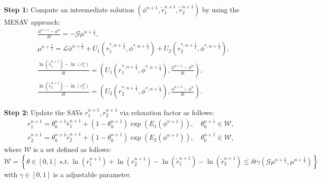 \documentclass[final,review,onefignum,onetabnum]{siamart190516}
\theoremstyle{plain}
\begin{document}
\textbf{Step 1:} Compute an intermediate solution $(\phi^{n+1}, \tilde{r}_{1}^{n+1}, \tilde{r}_{2}^{n+1})$ by using  the MESAV approach:
\begin{eqnarray}
\label{eq:R-MESAV1-CN-1}
& & \frac{\phi^{n+1}-\phi^{n}}{\delta t} =-\mathcal{G} \mu^{n+\frac{1}{2}}, \\
\label{eq:R-MESAV1-CN-2}
& & \mu^{n+\frac{1}{2}} =\mathcal{L} \phi^{n+\frac{1}{2}}+U_{1}\left(r_{1}^{*, n+\frac{1}{2}}, \phi^{*, n+\frac{1}{2}}\right)+U_{2}\left(r_{2}^{*, n+\frac{1}{2}}, \phi^{*, n+\frac{1}{2}}\right), \\ 
\label{eq:R-MESAV1-CN-3}
& & \frac{\ln(\tilde{r}_{1}^{n+1})-\ln(r_{1}^{n})}{\delta t} =\left(U_{1}\left(r_{1}^{*, n+\frac{1}{2}}, \phi^{*, n+\frac{1}{2}}\right), \frac{\phi^{n+1}-\phi^{n}}{\delta t}\right), \\
\label{eq:R-MESAV1-CN-4}
& & \frac{\ln(\tilde{r}_{2}^{n+1})-\ln(r_{2}^{n})}{\delta t} =\left(U_{2}\left(r_{2}^{*, n+\frac{1}{2}}, \phi^{*, n+\frac{1}{2}}\right), \frac{\phi^{n+1}-\phi^{n}}{\delta t}\right).
\end{eqnarray}

\textbf{Step 2:} Update the SAVs $r_{1}^{n+1}, r_{2}^{n+1}$ via relaxation factor as follows: 
\begin{equation}\label{eq:R-MESAV1-CN-5}
\begin{aligned}
& r_{1}^{n+1} = \theta_{0}^{n+1} \tilde{r}_{1}^{n+1} + (1-\theta_{0}^{n+1})\exp\left(E_{1}(\phi^{n+1})\right), \quad \theta_{0}^{n+1} \in \mathcal{W}, \\
& r_{2}^{n+1} = \theta_{0}^{n+1} \tilde{r}_{2}^{n+1} + (1-\theta_{0}^{n+1})\exp\left(E_{2}(\phi^{n+1})\right), \quad \theta_{0}^{n+1} \in \mathcal{W},
\end{aligned}
\end{equation}
where $\mathcal{W}$ is a set defined as follows: 
\begin{equation}\label{eq:set-condition-MESAV1-CN}
	\mathcal{W}=\left\lbrace \theta\in [0,1] \; s.t. \; \ln(r_{1}^{n+1})+\ln(r_{2}^{n+1}) - \ln(\tilde r_{1}^{n+1}) - \ln(\tilde r_{2}^{n+1}) \leq \delta t \gamma \left(\mathcal{G} \mu^{n+\frac{1}{2}}, \mu^{n+\frac{1}{2}}\right) \right\rbrace
\end{equation}
with $\gamma \in [0, 1]$ is a adjustable parameter. 
\end{document}
